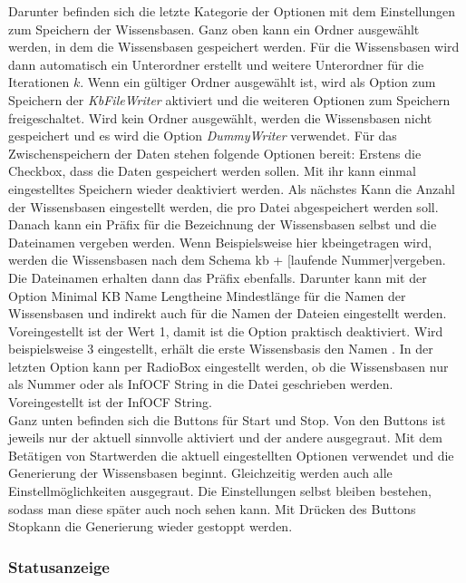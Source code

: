 \documentclass[12pt,a4paper]{article}
\begin{document}
Darunter befinden sich die letzte Kategorie der Optionen mit dem Einstellungen zum Speichern der Wissensbasen. Ganz oben kann ein Ordner ausgewählt werden, in dem die Wissensbasen gespeichert werden. Für die Wissensbasen wird dann automatisch ein Unterordner erstellt und weitere Unterordner für die Iterationen $k$. Wenn ein gültiger Ordner ausgewählt ist, wird als Option zum Speichern der \textit{KbFileWriter} aktiviert und die weiteren Optionen zum Speichern freigeschaltet. Wird kein Ordner ausgewählt, werden die Wissensbasen nicht gespeichert und es wird die Option \textit{DummyWriter}  verwendet. Für das Zwischenspeichern der Daten stehen folgende Optionen bereit: Erstens die Checkbox, dass die Daten gespeichert werden sollen. Mit ihr kann einmal eingestelltes Speichern wieder deaktiviert werden. Als nächstes Kann die Anzahl der Wissensbasen eingestellt werden, die pro Datei abgespeichert werden soll. Danach kann ein Präfix für die Bezeichnung der Wissensbasen selbst  und die Dateinamen vergeben werden. Wenn Beispielsweise hier \glqq kb\grqq \space eingetragen wird, werden die Wissensbasen nach dem Schema \glqq kb + [laufende Nummer]\grqq \space vergeben. Die Dateinamen erhalten dann das Präfix ebenfalls. Darunter kann mit der Option \glqq Minimal KB Name Length\grqq \space eine Mindestlänge für die Namen der Wissensbasen und indirekt auch für die Namen der Dateien eingestellt werden. Voreingestellt ist der Wert 1, damit ist die Option praktisch deaktiviert. Wird beispielsweise 3 eingestellt, erhält die erste Wissensbasis den Namen \grqq . In der letzten Option kann per RadioBox eingestellt werden, ob die Wissensbasen nur als Nummer oder als InfOCF String in die Datei geschrieben werden. Voreingestellt ist der InfOCF String.\\
Ganz unten befinden sich die Buttons für Start und Stop. Von den Buttons ist jeweils nur der aktuell sinnvolle aktiviert und der andere ausgegraut. Mit dem Betätigen von \glqq Start\grqq \space werden die aktuell eingestellten Optionen verwendet und die Generierung der Wissensbasen beginnt. Gleichzeitig werden auch alle Einstellmöglichkeiten ausgegraut. Die Einstellungen selbst bleiben bestehen, sodass man diese später auch noch sehen kann. Mit Drücken des Buttons \glqq Stop\grqq \space kann die Generierung wieder gestoppt werden.


\subsubsection{Statusanzeige}
\end{document}

